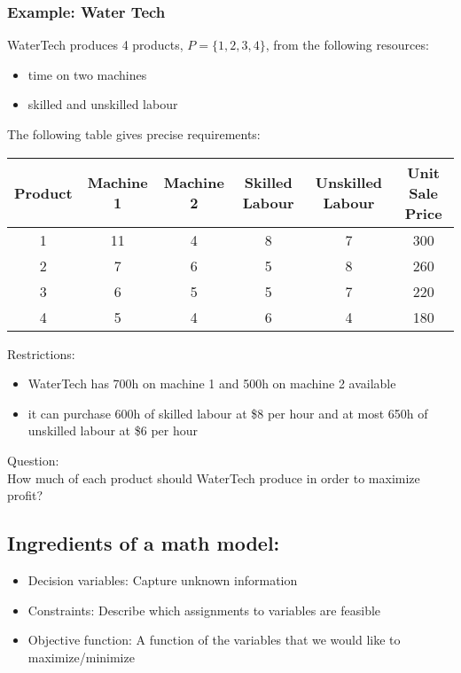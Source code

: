 \documentclass[letterpaper, 12pt]{article}
\begin{document}
    \subsubsection{Example: Water Tech}
    WaterTech produces 4 products, $P = \{1, 2, 3, 4\}$, from the following resources:\\
    \begin{itemize}
        \item time on two machines
        \item skilled and unskilled labour
    \end{itemize}
    The following table gives precise requirements:\\

    \bigskip
    \begin{tabular}{|c|c|c|c|c|c|}
        \hline
        Product & Machine 1 & Machine 2 & Skilled Labour & Unskilled Labour & Unit Sale Price\\
        \hline
        1 & 11 & 4 & 8 & 7 & 300\\
        \hline
        2 & 7 & 6 & 5 & 8 & 260\\
        \hline
        3 & 6 & 5 & 5 & 7 & 220\\
        \hline
        4 & 5 & 4 & 6 & 4 & 180\\
        \hline
    \end{tabular}
    \bigskip
    
    {\color{red} Restrictions:}\\
    \begin{itemize}
        \item WaterTech has 700h on machine 1 and 500h on machine 2 available
        \item it can purchase 600h of skilled labour at \$8 per hour and at most 650h of unskilled labour at \$6 per hour
    \end{itemize}
    {\color{red} Question:}\\
    How much of each product should WaterTech produce in order to maximize profit?\\
    \pagebreak
    \subsection{Ingredients of a math model:}
    \begin{itemize}
        \item {\color{red}Decision variables:} Capture unknown information
        \item {\color{red}Constraints:} Describe which assignments to variables are {\color{red}feasible}
        \item {\color{red}Objective function:} A function of the variables that we would like to maximize/minimize
    \end{itemize}
\end{document}
